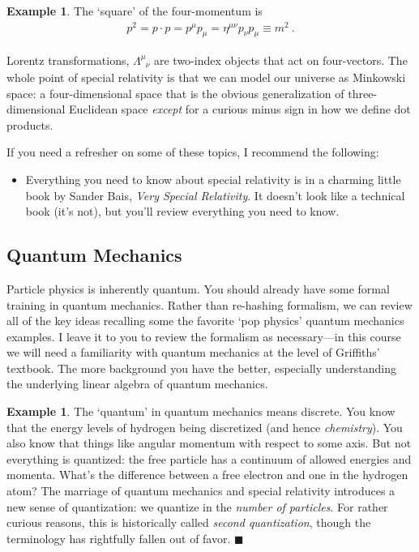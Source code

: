 \documentclass[12pt]{article}
\numberwithin{equation}{section}    %
\theoremstyle{definition}
\newtheorem{eg}[theorem]{Example}
\begin{document}
\begin{eg} The `square' of the four-momentum is
	\begin{align}
	p^2 = p\cdot p = p^\mu p_\mu = \eta^{\mu\nu} p_\nu p_\mu  \equiv m^2 \ . 	
	\label{eq:p2:m2}
	\end{align}
\end{eg}
Lorentz transformations, $\Lambda^\mu_{\phantom{\mu}\nu}$ are two-index objects that act on four-vectors. The whole point of special relativity is that we can model our universe as Minkowski space: a four-dimensional space that is the obvious generalization of three-dimensional Euclidean space \emph{except} for a curious minus sign in how we define dot products.

If you need a refresher on some of these topics, I recommend the following:
\begin{itemize}
	\item Everything you need to know about special relativity is in a charming little book by Sander Bais, \emph{Very Special Relativity}. It doesn't look like a technical book (it's not), but you'll review everything you need to know.
\end{itemize}

\subsection{Quantum Mechanics}

Particle physics is inherently quantum.
%
You should already have some formal training in quantum mechanics. Rather than re-hashing formalism, we can review all of the key ideas recalling some the favorite `pop physics' quantum mechanics examples. I leave it to you to review the formalism as necessary---in this course we will need a familiarity with quantum mechanics at the level of Griffiths' textbook. The more background you have the better, especially understanding the underlying linear algebra of quantum mechanics.

\begin{eg}
The `quantum' in quantum mechanics means discrete. You know that the energy levels of hydrogen being discretized (and hence \emph{chemistry}). You also know that things like angular momentum with respect to some axis. But not everything is quantized: the free particle has a continuum of allowed energies and momenta. What's the difference between a free electron and one in the hydrogen atom? 
%
The marriage of quantum mechanics and special relativity introduces a new sense of quantization: we quantize in the \emph{number of particles}. For rather curious reasons, this is historically called \emph{second quantization}, though the terminology has rightfully fallen out of favor.  $\blacksquare$
\end{eg}
\end{document}
